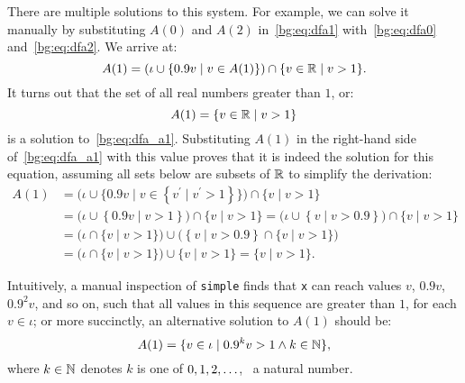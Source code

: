 There are multiple solutions to this system.  For example, we can solve
it manually by substituting $A(0)$ and $A(2)$ in~\eqref{bg:eq:dfa1}
with~\eqref{bg:eq:dfa0} and~\eqref{bg:eq:dfa2}.  We arrive at:
\begin{equation}
    A(1) = \left(
        \iota \cup \left\{ 0.9 v \mid v \in A(1) \right\}
    \right) \cap \{ v \in \mathbb{R} \mid v > 1 \}.
    \label{bg:eq:dfa_a1}
\end{equation}
It turns out that the set of all real numbers greater than $1$, or:
\begin{equation}
    A(1) = \{ v \in \mathbb{R} \mid v > 1 \}
    \label{bg:eq:a11}
\end{equation}
is a solution to~\eqref{bg:eq:dfa_a1}.  Substituting $A(1)$ in the right-hand
side of~\eqref{bg:eq:dfa_a1} with this value proves that it is indeed the
solution for this equation, assuming all sets below are subsets of $\mathbb{R}$
to simplify the derivation:
\begin{equation}
    \begin{aligned}
        A(1)
        &= \bigg( \iota \cup \Big\{ 0.9 v \mid v \in
                \left\{ v^\prime \mid v^\prime > 1 \right\}
           \Big\} \bigg) \cap \{ v \mid v > 1 \} \\
        &= \bigg( \iota \cup \left\{ 0.9 v \mid v > 1 \right\} \bigg) \cap
           \{ v \mid v > 1 \}
         = \bigg( \iota \cup \left\{ v \mid v > 0.9 \right\} \bigg) \cap
           \{ v \mid v > 1 \} \\
        &= \bigg( \iota \cap \{ v \mid v > 1 \} \bigg) \cup
           \bigg(
               \left\{ v \mid v > 0.9 \right\} \cap \{ v  \mid v > 1 \}
           \bigg) \\
        &= \bigg( \iota \cap \{ v \mid v > 1 \} \bigg) \cup
           \{ v \mid v > 1 \}
         = \{ v \mid v > 1 \}.
    \end{aligned}
\end{equation}

Intuitively, a manual inspection of \verb|simple| finds that \verb|x| can
reach values $v$, $0.9 v$, $0.9^2 v$, and so on, such that all values in this
sequence are greater than $1$, for each $v \in \iota$; or more succinctly, an
alternative solution to $A(1)$ should be:
\begin{equation}
    A(1) = \{ v \in \iota \mid 0.9^k v > 1 \wedge k \in \mathbb{N} \},
    \label{bg:eq:a12}
\end{equation}
where $k \in \mathbb{N}$ denotes $k$ is one of $0, 1, 2, \mathellipsis$, \ie~a
natural number.

